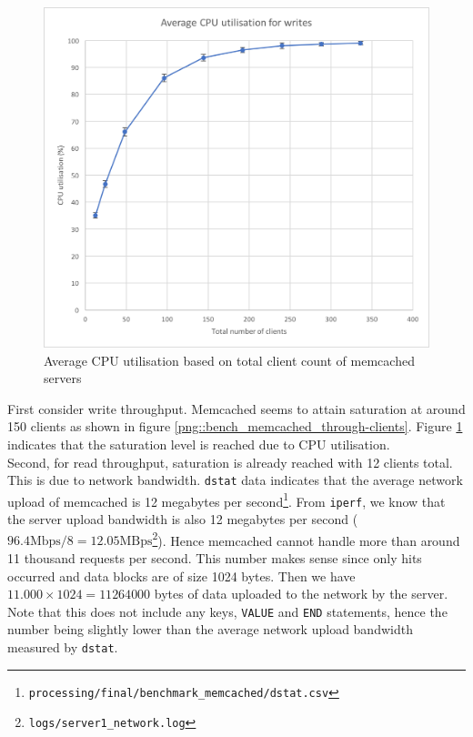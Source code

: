 \documentclass[11pt,a4paper]{article}
\begin{document}
\begin{figure}[!h]
\begin{minipage}[b]{.45\textwidth}
        \includegraphics[width=\textwidth]{processing/graphics/bench_memcached_cpu_util.png}
        \caption{Average CPU utilisation based on total client count of memcached servers}
        \label{png::bench_memcached_cpu_util}
    \end{minipage}
\end{figure}

First consider write throughput. Memcached seems to attain saturation at around 150 clients as shown in figure \ref{png::bench_memcached_through-clients}. Figure \ref{png::bench_memcached_cpu_util} indicates that the saturation level is reached due to CPU utilisation.\\
\indent Second, for read throughput, saturation is already reached with 12 clients total. This is due to network bandwidth. \texttt{dstat} data indicates that the average network upload of memcached is 12 megabytes per second\footnote{\texttt{processing/final/benchmark_memcached/dstat.csv}}. From \texttt{iperf}, we know that the server upload bandwidth is also 12 megabytes per second ($96.4\text{Mbps}/8=12.05\text{MBps}$\footnote{\label{source::server_net}\texttt{logs/server1_network.log}}). Hence memcached cannot handle more than around 11 thousand requests per second. This number makes sense since only hits occurred and data blocks are of size 1024 bytes. Then we have $11.000 \times 1024 = 11 264 000$ bytes of data uploaded to the network by the server. Note that this does not include any keys, \texttt{VALUE} and \texttt{END} statements, hence the number being slightly lower than the average network upload bandwidth measured by \texttt{dstat}.
\end{document}
